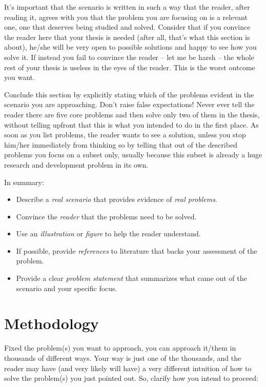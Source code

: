 It's important that the scenario is written in such a way that the reader, after reading it, agrees with you that the problem you are focusing on is a relevant one, one that deserves being studied and solved. Consider that if you convince the reader here that your thesis is needed (after all, that's what this section is about), he/she will be very open to possible solutions and happy to see how you solve it. If instead you fail to convince the reader -- let me be harsh -- the whole rest of your thesis is useless in the eyes of the reader. This is the worst outcome you want.

Conclude this section by explicitly stating which of the problems evident in the scenario you are approaching. Don't raise false expectations! Never ever tell the reader there are five core problems and then solve only two of them in the thesis, without telling upfront that this is what you intended to do in the first place. As soon as you list problems, the reader wants to see a solution, unless you stop him/her immediately from thinking so by telling that out of the described problems you focus on a subset only, usually because this subset is already a huge research and development problem in its own.

In summary:

\begin{itemize}
\item[\Square] Describe a \emph{real scenario} that provides evidence of \emph{real problems}.
\item[\Square] Convince the \emph{reader} that the problems need to be solved.
\item[\Square] Use an \emph{illustration} or \emph{figure} to help the reader understand.
\item[\Square] If possible, provide \emph{references} to literature that backs your assessment of the problem.
\item[\Square] Provide a clear \emph{problem statement} that summarizes what came out of the scenario and your specific focus.
\end{itemize}


\section{Methodology}
Fixed the problem(s) you want to approach, you can approach it/them in thousands of different ways. Your way is just one of the thousands, and the reader may have (and very likely will have) a very different intuition of how to solve the problem(s) you just pointed out. So, clarify how you intend to proceed:

